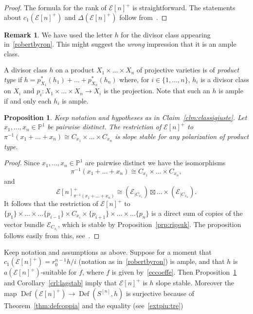 \documentclass[11pt]{amsart}
\newcommand{\PP}{{\mathbb P}}
\let\mathcal\mathscr
\def\cE{\mathcal{E}}
\DeclareMathOperator{\Def}{Def}
\newtheorem{prp}[lmm]{Proposition}
\theoremstyle{definition}
\newtheorem{rmk}[lmm]{Remark}
\theoremstyle{remark}
\begin{document}
%
%
\begin{proof}
%
The formula for the rank of $\cE[n]^{+}$ is straightforward. The statements about $c_1(\cE[n]^{+})$ and $\Delta(\cE[n]^{+})$ follow 
from~\cite[Prop.~3.2]{og:fascik3n}.
%
\end{proof}
%
%
\begin{rmk}
%
We have used the letter $h$ for the divisor class appearing in~\eqref{robertbyron}. This might suggest the \emph{wrong} impression that it is an ample class.
%
\end{rmk}
%
A divisor class $h$ on a product $X_1\times \ldots\times X_n$ of projective varieties is of \emph{product type} if 
$h=p_{X_1}^{*}(h_1)+\ldots+p_{X_n}^{*}(h_n)$ where, for $i\in\{1,\ldots,n\}$, 
$h_i$ is a divisor class on $X_i$ and  $p_i\colon
X_1\times \ldots\times X_n\to X_i$ is the projection. Note that such an $h$ is ample if and only  each $h_i$ is  ample.
%
\begin{prp}\label{prp:restrizstab}
%
Keep notation and hypotheses as  in Claim~\ref{clm:classigiuste}. Let $x_1,\ldots,x_n\in\PP^1$ be pairwise distinct.
The restriction of $\cE[n]^{+}$ to $\pi^{-1}(x_1+\ldots+x_n)\cong C_{x_1}\times\ldots\times C_{x_n}$ 
is slope stable for any polarization of product type.
%
\end{prp}
%
%
\begin{proof}
%
Since  $x_1,\ldots,x_n\in\PP^1$ are pairwise distinct we have the isomorphisms
%
\begin{equation*}
%
\pi^{-1}(x_1+\ldots+ x_n)\cong C_{x_1}\times\ldots\times C_{x_n},
%
\end{equation*}
%
and
%
\begin{equation*}
%
\cE[n]^{+}_{\pi^{-1}(x_1+\ldots+ x_n)}\cong \left(\cE_{|C_{x_1}}\right)\boxtimes\ldots\times \left(\cE_{|C_{x_n}}\right).
%
\end{equation*}
%
It follows that the restriction of $\cE[n]^{+}$ to $\{p_1\}\times \ldots \times \ldots\{p_{i-1}\}\times C_{x_i}\times\{p_{i+1}\}\times\ldots\times \ldots\{p_{n}\}$ is a direct sum of copies of the vector bundle $\cE_{C_{x_i}}$, which is stable
by Proposition~\ref{prp:rigsuk}. The proposition follows easily from this, see~\cite[Lemma~4.7]{og:fascik3n}. 
%
\end{proof}
%
Keep notation and assumptions as above. Suppose for a moment that $c_1(\cE[n]^{+})=r_0^{n-1}h/i$ (notation as in~\eqref{robertbyron}) is ample, and that $h$ is 
$a(\cE[n]^{+})$-suitable for $f$, where $f$ is given by~\eqref{eccoeffe}. Then  Proposition~\ref{prp:restrizstab} and 
Corollary~\ref{crl:lagstab} imply that $\cE[n]^{+}$ is $h$ slope stable. Moreover the map $\Def(\cE[n]^{+})\to \Def(S^{[n]},h)$ is surjective because  of Theorem~\ref{thm:defcoppia} and the equality (see~\eqref{extpiu:tre})
\end{document}
